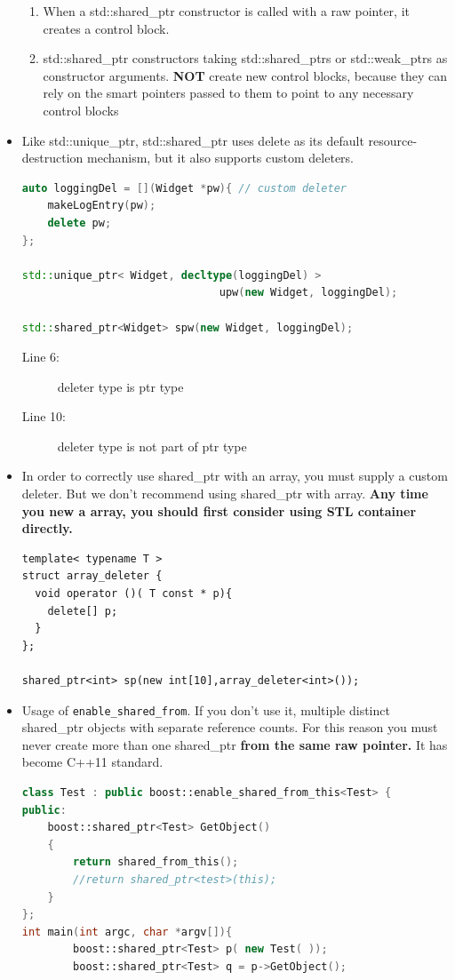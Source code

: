 \documentclass[a4paper,11pt,twoside]{book}
\begin{document}
\begin{itemize}
\begin{enumerate}
\item When a std::shared\_ptr constructor is called with a raw pointer, it creates a control block.

\item std::shared\_ptr constructors taking std::shared\_ptrs or std::weak\_ptrs as constructor arguments. \textbf{NOT} create new control blocks, because they can rely on the smart pointers passed to them to point to any necessary control blocks

\end{enumerate}


\item Like std::unique\_ptr, std::shared\_ptr uses delete as its default resource-destruction mechanism, but it also supports custom deleters.
\begin{lstlisting}[frame=single, language=c++]
auto loggingDel = [](Widget *pw){ // custom deleter
	makeLogEntry(pw);
	delete pw;
};

std::unique_ptr< Widget, decltype(loggingDel) >
                               upw(new Widget, loggingDel);

std::shared_ptr<Widget> spw(new Widget, loggingDel);
\end{lstlisting}
\begin{description}
	\item[Line 6:] deleter type is ptr type
	\item[Line 10:] deleter type is not part of ptr type
\end{description}

\item In order to correctly use shared\_ptr with an array, you must supply a custom deleter. But we don't recommend using shared\_ptr with array. \textbf{Any time you new a array, you should first consider using STL container directly.}
\begin{lstlisting}[numbers=none]
template< typename T >
struct array_deleter {
  void operator ()( T const * p){
    delete[] p;
  }
};

shared_ptr<int> sp(new int[10],array_deleter<int>());
\end{lstlisting}

\item Usage of \texttt{enable\_shared\_from}. If you don't use it, multiple distinct shared\_ptr objects with separate reference counts. For this reason you must never create more than one shared\_ptr \textbf{from the same raw pointer.} It has become C++11 standard.
\begin{lstlisting}[frame=single, language=c++]
class Test : public boost::enable_shared_from_this<Test> {
public:
    boost::shared_ptr<Test> GetObject()
    {
        return shared_from_this();
        //return shared_ptr<test>(this);
    }
};
int main(int argc, char *argv[]){
        boost::shared_ptr<Test> p( new Test( ));
        boost::shared_ptr<Test> q = p->GetObject();
    

\end{lstlisting}
\end{itemize}
\end{document}
